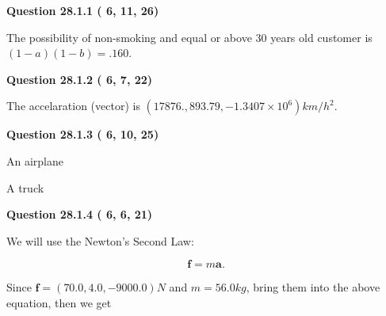 \documentclass[12pt]{article}
\begin{document}
\vspace{0.2in}
  
{\textbf{\Large{Question
28.1.1 
 (          6,         11,         26)
}}}
  
  
 
 
\noindent{}

The possibility of  %
 non-smoking and  %
equal or above 30 years old
customer is $ (1-a)(1-b) =  %
.160 $.
 
 
  
\vspace{0.2in}
  
{\textbf{\Large{Question
28.1.2 
 (          6,          7,         22)
}}}
  
  
 
 
\noindent{}
 
 
The accelaration (vector) is
$(
17876.,
893.79 ,
-1.3407 \times 10^{6}
)km/h^2.
$
 
 
 
 
  
\vspace{0.2in}
  
{\textbf{\Large{Question
28.1.3 
 (          6,         10,         25)
}}}
  
  
 
 
\noindent{}
 
 
An airplane
 
 
A truck
 
 
 
 
  
\vspace{0.2in}
  
{\textbf{\Large{Question
28.1.4 
 (          6,          6,         21)
}}}
  
  
 
 
\noindent{}

We will use the Newton's Second Law:
 
\[
\mathbf{f}=m\mathbf{a}.
\]
 
Since $\mathbf{f}=( %
70.0,  %
4.0,  %
-9000.0 )N$
and $m= %
56.0 kg$, bring them into the above equation, then we get
 
\end{document}

